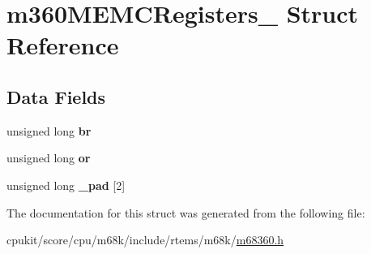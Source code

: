 \hypertarget{structm360MEMCRegisters__}{}\section{m360\+M\+E\+M\+C\+Registers\+\_\+ Struct Reference}
\label{structm360MEMCRegisters__}
\subsection*{Data Fields}
\begin{DoxyCompactItemize}
\item 
\mbox{\label{structm360MEMCRegisters___ad81bac2b7147e51b08e64d0c83d37197}} 
unsigned long {\bfseries br}
\item 
\mbox{\label{structm360MEMCRegisters___aaef2b59fffcfb430490acd7f77232fea}} 
unsigned long {\bfseries or}
\item 
\mbox{\label{structm360MEMCRegisters___a26f8d34ee60ba24be13af0235458b916}} 
unsigned long {\bfseries \+\_\+pad} \mbox{[}2\mbox{]}
\end{DoxyCompactItemize}


The documentation for this struct was generated from the following file\+:\begin{DoxyCompactItemize}
\item 
cpukit/score/cpu/m68k/include/rtems/m68k/\mbox{\hyperlink{m68360_8h}{m68360.\+h}}\end{DoxyCompactItemize}
